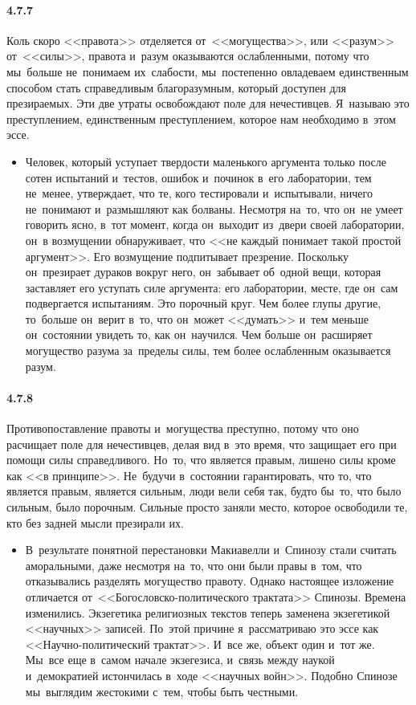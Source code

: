 \paragraph{4.7.7}\hypertarget{par:4.7.7}{} Коль скоро <<правота>> отделяется от~<<могущества>>, или <<разум>> от~<<силы>>, правота и~разум оказываются ослабленными, потому что мы~больше не~понимаем их~слабости, мы~постепенно овладеваем единственным способом стать справедливым благоразумным, который доступен для презираемых. Эти две утраты освобождают поле для нечестивцев. Я~называю это преступлением, единственным преступлением, которое нам необходимо в~этом эссе.
	\begin{itemize}
	\item 
	Человек, который уступает твердости маленького аргумента только после сотен испытаний и~тестов, ошибок и~починок в~его лаборатории, тем не~менее, утверждает, что те, кого тестировали и~испытывали, ничего не~понимают и~размышляют как болваны. Несмотря на~то, что он~не умеет говорить ясно, в~тот момент, когда он~выходит из~двери своей лаборатории, он~в возмущении обнаруживает, что <<не каждый понимает такой простой аргумент>>. Его возмущение подпитывает презрение. Поскольку он~презирает дураков вокруг него, он~забывает об~одной вещи, которая заставляет его уступать силе аргумента: его лаборатории, месте, где он~сам подвергается испытаниям. Это порочный круг. Чем более глупы другие, то~больше он~верит в~то, что он~может <<думать>> и~тем меньше он~состоянии увидеть то, как он~научился. Чем больше он~расширяет могущество разума за~пределы силы, тем более ослабленным оказывается разум.
	\end{itemize}


\paragraph{4.7.8}\hypertarget{par:4.7.8}{} Противопоставление правоты и~могущества преступно, потому что оно расчищает поле для нечестивцев, делая вид в~это время, что защищает его при помощи силы справедливого. Но~то, что является правым, лишено силы кроме как <<в принципе>>. Не~будучи в~состоянии гарантировать, что то, что является правым, является сильным, люди вели себя так, будто бы~то, что было сильным, было порочным. Сильные просто заняли место, которое освободили те, кто без задней мысли презирали их.
	\begin{itemize}
	\item 
 В~результате понятной перестановки Макиавелли и~Спинозу стали считать аморальными, даже несмотря на~то, что они были правы в~том, что отказывались разделять могущество правоту. Однако настоящее изложение отличается от~<<Богословско-политического трактата>> Спинозы. Времена изменились. Экзегетика религиозных текстов теперь заменена экзегетикой <<научных>> записей. По~этой причине я~рассматриваю это эссе как <<Научно-политический трактат>>. И~все же, объект один и~тот же. Мы~все еще в~самом начале экзегезиса, и~связь между наукой и~демократией истончилась в~ходе <<научных войн>>. Подобно Спинозе мы~выглядим жестокими с~тем, чтобы быть честными.
	\end{itemize}	

